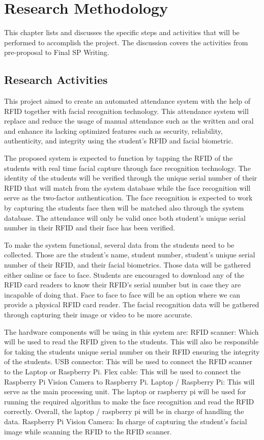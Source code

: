 \chapter{Research Methodology}
This chapter lists and discusses the specific steps and activities that will be performed  to accomplish the project. 
The discussion covers the activities from pre-proposal to Final SP Writing.

\section{Research Activities}
This project aimed to create an automated attendance system with the help of RFID together with facial recognition technology. This attendance system will replace and reduce the usage of manual attendance such as the written and oral and enhance its lacking optimized features such as security, reliability, authenticity, and integrity using the student’s RFID and facial biometric.

The proposed system is expected to function by tapping the RFID of the students with real time facial capture through face recognition technology. The identity of the students will be verified through the unique serial number of their RFID that will match from the system database while the face recognition will serve as the two-factor authentication. The face recognition is expected to work by capturing the students face then will be matched also through the system database. The attendance will only be valid once both student’s unique serial number in their RFID and their face has been verified.

To make the system functional, several data from the students need to be collected. Those are the student’s name, student number, student’s unique serial number of  their RFID, and their facial biometrics. Those data will be gathered either online or face to face. Students are encouraged to download any of the RFID card readers to know their RFID’s serial number but in case they are incapable of doing that. Face to face to face will be an option where we can provide a physical RFID card reader. The facial recognition data will be gathered through capturing their image or video to be more accurate. 

The hardware components will be using in this system are:
RFID scanner: Which will be used to read the RFID given to the students. This will also be responsible for taking the students unique serial number on their RFID ensuring the integrity of the students.
USB connector: This will be used to connect the RFID scanner to the Laptop or Raspberry Pi. Flex cable: This will be used to connect the Raspberry Pi Vision Camera to Raspberry Pi.
Laptop / Raspberry Pi: This will serve as the main processing unit. The laptop or raspberry pi will be used for running the required algorithm to make the face recognition and read the RFID correctly. Overall, the laptop / raspberry pi will be in charge of handling the data.
Raspberry Pi Vision Camera: In charge of capturing the student’s facial image while scanning the RFID to the RFID scanner. 

